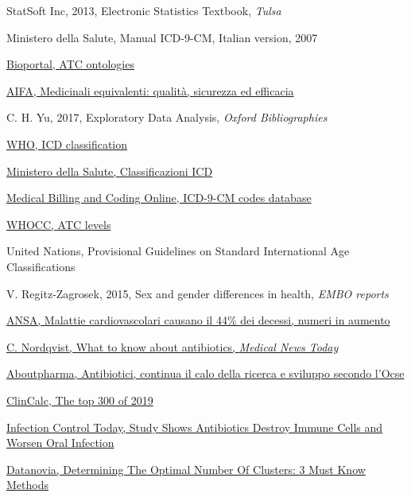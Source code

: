 \begin{thebibliography}{}
	StatSoft Inc, 2013, Electronic Statistics Textbook, \textit{Tulsa}
	
	Ministero della Salute, Manual ICD-9-CM, Italian version, 2007
	
	\href{https://bioportal.bioontology.org/ontologies/ATC}{Bioportal, ATC ontologies}
	
	\href{http://www.agenziafarmaco.gov.it/sites/default/files/medicinali\_equivalenti-qualita\_sicurezza\_efficacia.pdf}{AIFA, Medicinali equivalenti: qualità, sicurezza ed efficacia}
	
	C. H. Yu, 2017, Exploratory Data Analysis, \textit{Oxford Bibliographies}
	
	\href{https://www.who.int/classifications/icd/en/}{WHO, ICD classification}
	
	\href{http://www.salute.gov.it/portale/temi/p2\_6.jsp?lingua=italiano\&id=1982\&area=statisticheSSN\&menu=definizioni}{Ministero della Salute, Classificazioni ICD}
	
	\href{https://www.medicalbillingandcodingonline.com/icd-cm-codes/}{Medical Billing and Coding Online, ICD-9-CM codes database}
	
	\href{https://www.whocc.no/filearchive/publications/2019\_guidelines\_web.pdf}{WHOCC, ATC levels}
	
	United Nations, Provisional Guidelines on Standard International Age Classifications
	
	V. Regitz-Zagrosek, 2015, Sex and gender differences in health, \textit{EMBO reports}
	
	\href{http://www.ansa.it/canale\_saluteebenessere/notizie/medicina/2018/09/24/malattie-cardiovascolari-causano-il-44-dei-decessi-numeri-in-aumento\_3862cbb2-0801-4962-89b7-a6ee5163f66f.html}{ANSA, Malattie cardiovascolari causano il 44\% dei decessi, numeri in aumento}
	
	\href{https://www.medicalnewstoday.com/articles/10278.php}{C. Nordqvist, What to know about antibiotics, \textit{Medical News Today}}
	
	\href{https://www.aboutpharma.com/blog/2019/01/10/antibiotici-continua-il-calo-della-ricerca-e-sviluppo-secondo-locse/}{Aboutpharma, Antibiotici, continua il calo della ricerca e sviluppo secondo l’Ocse}
	
	\href{https://clincalc.com/DrugStats/Top300Drugs.aspx}{ClinCalc, The top 300 of 2019}
	
	\href{https://www.infectioncontroltoday.com/antibiotics-antimicrobials/study-shows-antibiotics-destroy-immune-cells-and-worsen-oral-infection}{Infection Control Today, Study Shows Antibiotics Destroy Immune Cells and Worsen Oral Infection}
	
	\href{https://www.datanovia.com/en/lessons/determining-the-optimal-number-of-clusters-3-must-know-methods/}{Datanovia, Determining The Optimal Number Of Clusters: 3 Must Know Methods}
	
\end{thebibliography}
	